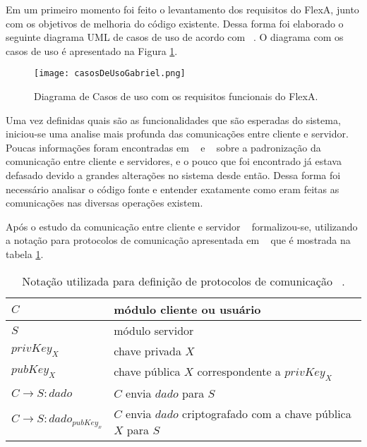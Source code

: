         Em um primeiro momento foi feito o levantamento dos requisitos do FlexA, junto com os objetivos de melhoria do código existente. Dessa forma foi elaborado o seguinte diagrama UML de casos de uso de acordo com ~\cite{umlCasosDeUso}. O diagrama com os casos de uso é apresentado na Figura \ref{fig:casosDeUsoGabriel}.
        
        \begin{figure}[!ht]
        \centering
        \texttt{[image: casosDeUsoGabriel.png]}
        \caption{Diagrama de Casos de uso com os requisitos funcionais do FlexA.}
        \label{fig:casosDeUsoGabriel}
        \end{figure}
    
        Uma vez definidas quais são as funcionalidades que são esperadas do sistema, iniciou-se uma analise mais profunda das comunicações entre cliente e servidor. Poucas informações foram encontradas em ~\cite{mario} e ~\cite{silas} sobre a padronização da comunicação entre cliente e servidores, e o pouco que foi encontrado já estava defasado devido a grandes alterações no sistema desde então. Dessa forma foi necessário analisar o código fonte e entender exatamente como eram feitas as comunicações nas diversas operações existem.
        
        Após o estudo da comunicação entre cliente e servidor ~\cite{mario} formalizou-se, utilizando a notação para protocolos de comunicação apresentada em ~\cite{ross} que é mostrada na tabela \ref{tab:notacao}.
        
        \begin{table}
        
        \centering
        \begin{tabular}{|l|l|}
        \hline
        
        $C$ & módulo cliente ou usuário \\
        \hline
        $S$ & módulo servidor \\
        \hline
        $privKey_{X}$ & chave privada $X$ \\
        \hline
        $pubKey_{X}$ & chave pública $X$ correspondente a $privKey_{X}$\\
        \hline
        $C \rightarrow S : dado$ & $C$ envia $dado$ para $S$\\
        \hline
        $C \rightarrow S : {dado}_{pubKey_{x}}$ & $C$ envia $dado$ criptografado com a chave pública $X$ para $S$\\
        \hline

        \end{tabular}
        \caption{Notação utilizada para definição de protocolos de comunicação ~\cite{ross}.}
        \label{tab:notacao}
        \end{table}
        
